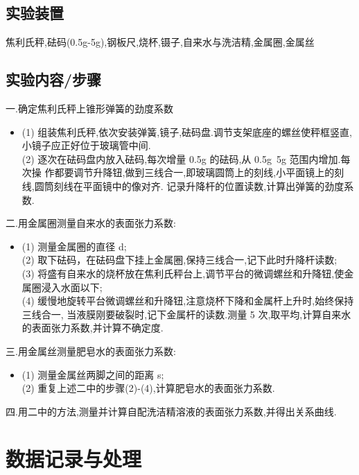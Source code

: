 \documentclass[12pt,a4paper,oneside]{ctexart}
\begin{document}
\subsection{实验装置}
焦利氏秤,砝码(0.5g-5g),钢板尺,烧杯,镊子,自来水与洗洁精,金属圈,金属丝
\subsection{实验内容/步骤}
\noindent
一.确定焦利氏秤上锥形弹簧的劲度系数
\begin{itemize}
    \item[] 
    (1) 组装焦利氏秤,依次安装弹簧,镜子,砝码盘.调节支架底座的螺丝使秤框竖直,
小镜子应正好位于玻璃管中间.\\
(2) 逐次在砝码盘内放入砝码,每次增量 0.5g 的砝码,从 0.5g~5g 范围内增加.每次操
作都要调节升降钮,做到三线合一,即玻璃圆筒上的刻线,小平面镜上的刻线,圆筒刻线在平面镜中的像对齐.
记录升降杆的位置读数,计算出弹簧的劲度系数.
\end{itemize}
二.用金属圈测量自来水的表面张力系数:
\begin{itemize}
    \item[] 
    (1) 测量金属圈的直径 d;\\
(2) 取下砝码，在砝码盘下挂上金属圈,保持三线合一,记下此时升降杆读数;\\
(3) 将盛有自来水的烧杯放在焦利氏秤台上,调节平台的微调螺丝和升降钮,使金属圈浸入水面以下;\\
(4) 缓慢地旋转平台微调螺丝和升降钮,注意烧杯下降和金属杆上升时,始终保持三线合一,
当液膜刚要破裂时,记下金属杆的读数.测量 5 次,取平均,计算自来水的表面张力系数,并计算不确定度.
\end{itemize}
三.用金属丝测量肥皂水的表面张力系数:
\begin{itemize}
    \item[] 
    (1) 测量金属丝两脚之间的距离 s;\\
    (2) 重复上述二中的步骤(2)-(4),计算肥皂水的表面张力系数.
\end{itemize}
四.用二中的方法,测量并计算自配洗洁精溶液的表面张力系数,并得出关系曲线.
\section{数据记录与处理}
\end{document}
